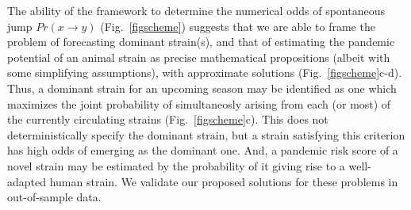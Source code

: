 \documentclass[onecolumn, compsoc,10pt]{IEEEtran}
\begin{document}

The ability of the \enet framework to determine the numerical odds of spontaneous jump $ Pr(x \rightarrow y)$ (Fig.~\ref{figscheme}) suggests that we are able to frame the problem of forecasting  dominant strain(s), and that of estimating the  pandemic potential of an animal strain as precise mathematical propositions (albeit with some simplifying assumptions), with  approximate solutions (Fig.~\ref{figscheme}c-d). Thus,  a dominant strain for an upcoming  season may be identified as one which maximizes the joint probability of simultaneosly arising from each (or most)  of the currently circulating strains (Fig.~\ref{figscheme}c).  This does not deterministically specify the dominant strain, but a strain satisfying this criterion  has  high odds of emerging as the dominant one. And, a pandemic risk score of a novel strain may be estimated by the probability of it giving rise to a well-adapted human strain.  We validate  our proposed solutions for these problems in out-of-sample data.
%
\end{document}
